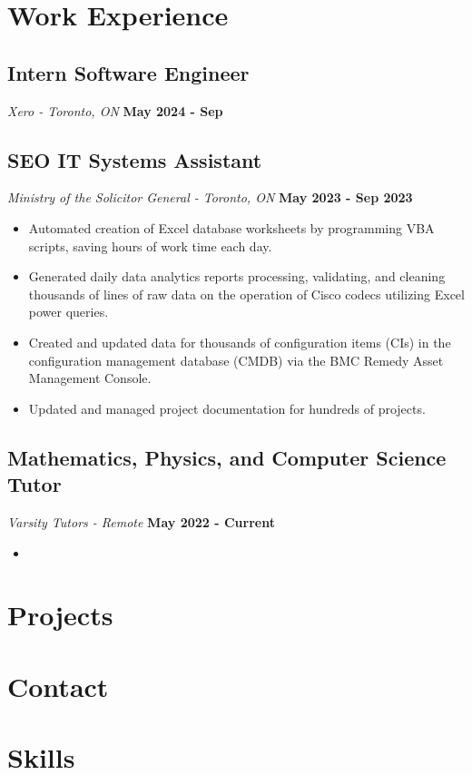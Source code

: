 \documentclass{article}
\begin{document}
\section*{Work Experience}

\subsection*{Intern Software Engineer}
\textit{Xero - Toronto, ON}
\hfill
\textbf{May 2024 - Sep}

\subsection*{SEO IT Systems Assistant}
\textit{Ministry of the Solicitor General - Toronto, ON}
\hfill
\textbf{May 2023 - Sep 2023}
\begin{itemize}
    \item Automated creation of Excel database worksheets by programming VBA scripts, saving hours of work time each day.
    \item Generated daily data analytics reports processing, validating, and cleaning thousands of lines of raw data on the operation of Cisco codecs utilizing Excel power queries.
    \item Created and updated data for thousands of configuration items (CIs) in the configuration management database (CMDB) via the BMC Remedy Asset Management Console.
    \item Updated and managed project documentation for hundreds of projects.
\end{itemize}

\subsection*{Mathematics, Physics, and Computer Science Tutor}
\textit{Varsity Tutors - Remote}
\hfill
\textbf{May 2022 - Current}
\begin{itemize}
    \item 
\end{itemize}

\section*{Projects}
\section*{Contact}
\section*{Skills}
\end{document}
